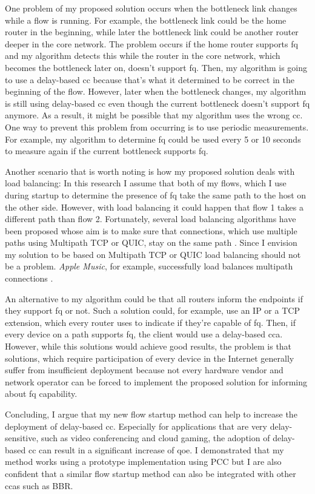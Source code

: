 \documentclass[conference]{IEEEtran}
\begin{document}
One problem of my proposed solution occurs when the bottleneck link changes while a flow is running. For example, the bottleneck link could be the home router in the beginning, while later the bottleneck link could be another router deeper in the core network. The problem occurs if the home router supports \gls{fq} and my algorithm detects this while the router in the core network, which becomes the bottleneck later on, doesn't support \gls{fq}. Then, my algorithm is going to use a delay-based \gls{cc} because that's what it determined to be correct in the beginning of the flow. However, later when the bottleneck changes, my algorithm is still using delay-based \gls{cc} even though the current bottleneck doesn't support \gls{fq} anymore. As a result, it might be possible that my algorithm uses the wrong \gls{cc}. One way to prevent this problem from occurring is to use periodic measurements. For example, my algorithm to determine \gls{fq} could be used every 5 or 10 seconds to measure again if the current bottleneck supports \gls{fq}. 

Another scenario that is worth noting is how my proposed solution deals with load balancing: In this research I assume that both of my flows, which I use during startup to determine the presence of \gls{fq} take the same path to the host on the other side. However, with load balancing it could happen that flow 1 takes a different path than flow 2. Fortunately, several load balancing algorithms have been proposed whose aim is to make sure that connections, which use multiple paths using Multipath TCP or QUIC, stay on the same path \citep{olivier_bonaventure_multipath_2018,olteanu_datacenter_2016,lienardy_towards_2016}. Since I envision my solution to be based on Multipath TCP or QUIC load balancing should not be a problem. \textit{Apple Music}, for example, successfully load balances multipath connections \citep{olivier_bonaventure_apple_2019}. 

An alternative to my algorithm could be that all routers inform the endpoints if they support \gls{fq} or not. Such a solution could, for example, use an IP or a TCP extension, which every router uses to indicate if they're capable of \gls{fq}. Then, if every device on a path supports \gls{fq}, the client would use a delay-based \gls{cca}. However, while this solutions would achieve good results, the problem is that solutions, which require participation of every device in the Internet generally suffer from insufficient deployment because not every hardware vendor and network operator can be forced to implement the proposed solution for informing about \gls{fq} capability. 

Concluding, I argue that my new flow startup method can help to increase the deployment of delay-based \gls{cc}. Especially for applications that are very delay-sensitive, such as video conferencing and cloud gaming, the adoption of delay-based \gls{cc} can result in a significant increase of \gls{qoe}. I demonstrated that my method works using a prototype implementation using PCC but I are also confident that a similar flow startup method can also be integrated with other \glspl{cca} such as BBR. 

\renewcommand*{\bibfont}{\small}


\end{document}
